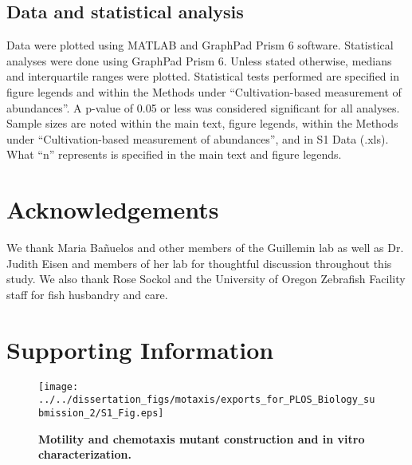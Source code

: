 \subsection{Data and statistical analysis}

Data were plotted using MATLAB and GraphPad Prism 6 software. Statistical analyses were done using GraphPad Prism 6. Unless stated otherwise, medians and interquartile ranges were plotted. Statistical tests performed are specified in figure legends and within the Methods under ``Cultivation-based measurement of abundances''. A p-value of 0.05 or less was considered significant for all analyses. Sample sizes are noted within the main text, figure legends, within the Methods under ``Cultivation-based measurement of abundances'', and in S1 Data (.xls). What ``n'' represents is specified in the main text and figure legends. 

\section{Acknowledgements}
We thank Maria Bañuelos and other members of the Guillemin lab as well as Dr. Judith Eisen and members of her lab for thoughtful discussion throughout this study. We also thank Rose Sockol and the University of Oregon Zebrafish Facility staff for fish husbandry and care.


\newpage
\section{Supporting Information}

\begin{figure}[h!]
	\centerline{
		\texttt{[image: ../../dissertation\_figs/motaxis/exports\_for\_PLOS\_Biology\_submission\_2/S1\_Fig.eps]}}
	\caption{\textbf{Motility and chemotaxis mutant construction and in vitro characterization.}}
\end{figure}

